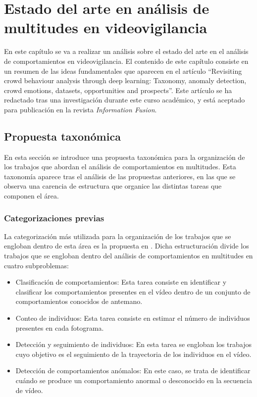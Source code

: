 \documentclass[../main.tex]{memoir}
\begin{document}
\chapter{Estado del arte en análisis de multitudes en
  videovigilancia}
\label{sec:state-of-the-art}

En este capítulo se va a realizar un análisis sobre el estado del arte
en el análisis de comportamientos en videovigilancia. El contenido de
este capítulo consiste en un resumen de las ideas fundamentales que
aparecen en el artículo ``Revisiting crowd behaviour analysis through
deep learning: Taxonomy, anomaly detection, crowd emotions, datasets,
opportunities and prospects''. Este artículo se ha redactado tras una
investigación durante este curso académico, y está aceptado para
publicación en la revista \textit{Information Fusion}.

\section{Propuesta taxonómica}

En esta sección se introduce una propuesta taxonómica para la
organización de los trabajos que abordan el análisis de
comportamientos en multitudes. Esta taxonomía aparece tras el análisis
de las propuestas anteriores, en las que se observa una carencia de
estructura que organice las distintas tareas que componen el área.

\subsection{Categorizaciones previas}

La categorización más utilizada para la organización de los trabajos
que se engloban dentro de esta área es la propuesta en
\cite{zitouni2016advances}. Dicha estructuración divide los trabajos
que se engloban dentro del análisis de comportamientos en multitudes
en cuatro subproblemas:

\begin{itemize}
\item Clasificación de comportamientos: Esta tarea consiste en
  identificar y clasificar los comportamientos presentes en el vídeo
  dentro de un conjunto de comportamientos conocidos de antemano.
\item Conteo de individuos: Esta tarea consiste en estimar el número
  de individuos presentes en cada fotograma.
\item Detección y seguimiento de individuos: En esta tarea se engloban
  los trabajos cuyo objetivo es el seguimiento de la trayectoria de
  los individuos en el vídeo.
\item Detección de comportamientos anómalos: En este caso, se trata de
  identificar cuándo se produce un comportamiento anormal o
  desconocido en la secuencia de vídeo.
\end{itemize}
\end{document}
